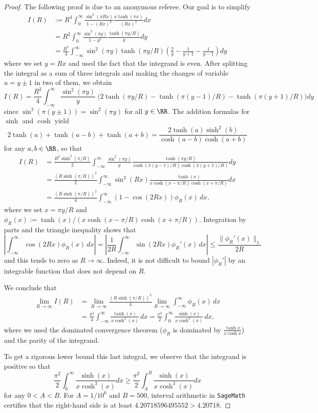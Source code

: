 \documentclass[12pt]{amsart}
\numberwithin{equation}{section}
\begin{document}
\begin{proof}
The following proof is due to an anonymous referee. Our goal is to simplify
\begin{align*}
I(R) &:= R^4\int_0^\infty \frac{\sin^2(\pi Rx)}{1-(Rx)^2} \frac{x\tanh(\pi x)}{(Rx)^2} dx \\ 
&= R^2\int_0^\infty \frac{\sin^2(\pi y)}{1-y^2} \frac{\tanh(\pi y / R)}{y} dy \\
& =  \frac{R^2}{4}\int_{-\infty}^\infty \sin^2(\pi y)\tanh(\pi y / R)\left(\frac{2}{y}-\frac{1}{y+1}-\frac{1}{y-1}\right) dy
\end{align*}
where we set $y=Rx$ and used the fact that the integrand is even. After splitting the integral as a sum of three integrals and making the changes of variable $u = y \pm 1$ in two of them, we obtain
\[
I(R)  = \frac{R^2}{4} \int_{-\infty}^\infty \frac{\sin^2(\pi y)}{y}\;\Big(2\tanh(\pi y /R) - \tanh(\pi(y-1)/R) - \tanh(\pi (y + 1) /R)\Big) dy
\]
since $\sin^2(\pi (y\pm 1))=\sin^2(\pi y)$ for all $y\in \RR$. The addition formulas for $\sinh$ and $\cosh$ yield
\[
2\tanh(a)+\tanh(a-b)+\tanh(a+b) = \frac{2\tanh(a)\sinh^2(b)}{\cosh(a-b)\cosh(a+b)}
\]
for any $a,b\in \RR$, so that
\begin{align*}
I(R)& = \frac{R^2 \sinh^2(\pi/R)}{2} \int_{-\infty}^\infty \frac{\sin^2(\pi y)}{y} \frac{\tanh(\pi y/R)}{\cosh(\pi (y - 1)/R)\cosh(\pi (y +1)/R)} dy \\
&= \frac{(R \sinh(\pi/R))^2}{2} \int_{-\infty}^\infty \sin^2(Rx)\frac{\tanh( x)}{x\cosh( x - \pi/R)\cosh( x + \pi/R)} dx \\
&= \frac{(R \sinh(\pi/R))^2}{4} \int_{-\infty}^\infty (1-\cos(2Rx))\phi_R(x) \,dx,
\end{align*}
where we set $x=\pi y /R$ and  $\phi_R(x):=\tanh(x)/(x\cosh(x - \pi/R)\cosh(x + \pi/R))$. Integration by parts and the triangle inequality shows that
\[
\left|\int_{-\infty}^\infty \cos(2Rx)\phi_R(x) \, dx \right| = \left|\frac{1}{2 R}\int_{-\infty}^\infty \sin(2 Rx)\phi_R'(x) \, dx \right| \leq \frac{\| \phi_R'(x) \|_1}{2 R}
\]
and this tends to zero as $R\to \infty$. Indeed, it is not difficult to bound $|\phi_R'|$ by an integrable function that does not depend on $R$.

We conclude that
\begin{align*}
\lim_{R\to\infty} I(R) &= \lim_{R\to\infty}\frac{(R \sinh(\pi/R))^2}{4}\lim_{R\to\infty}\int_{-\infty}^\infty \phi_R(x) \,dx \\
& = \frac{\pi^2}{4} \int_{-\infty}^\infty \frac{\tanh(x)}{x \cosh^2(x)} \,dx =  \frac{\pi^2}{2} \int_0^\infty \frac{\sinh(x)}{x \cosh^3(x)} \,dx,
\end{align*}
where we used the dominated convergence theorem ($\phi_R$ is dominated by $\frac{\tanh x}{x\cosh x}$) and the parity of the integrand. 

To get a rigorous lower bound this last integral, we observe that the integrand is positive so that
\[
\frac{\pi^2}{2}\int_0^\infty \frac{\sinh(x)}{x\cosh^3(x)}dx  \geq \frac{\pi^2}{2}\int_A^B \frac{\sinh(x)}{x\cosh^3(x)}dx 
\]
for any $0<A<B$. For $A = 1/10^6$ and $B=500$, interval arithmetic in \texttt{SageMath} certifies that the right-hand side is at least  $4.20718596495552>4.20718$.
\end{proof}
\end{document}
